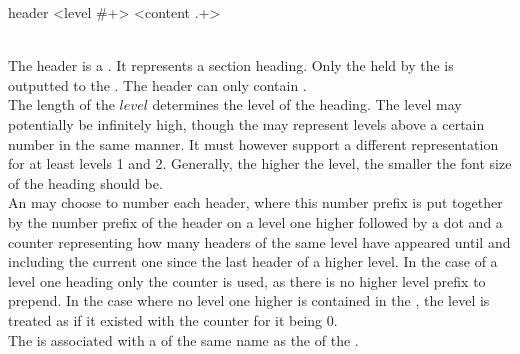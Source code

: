 \begin{identifier}{header}
<level #+> <content .+>
\end{identifier}
 \\

The header is a . It represents a section heading. Only the  held by the  is outputted to the . The header can only contain .\\

The length of the \inline$level$  determines the level of the heading. The level may potentially be infinitely high, though the  may represent levels above a certain number in the same manner. It must however support a different representation for at least levels 1 and 2. Generally, the higher the level, the smaller the font size of the heading should be. \\

An  may choose to number each header, where this number prefix is put together by the number prefix of the header on a level one higher followed by a dot and a counter representing how many headers of the same level have appeared until and including the current one since the last header of a higher level. In the case of a level one heading only the counter is used, as there is no higher level prefix to prepend. In the case where no level one higher is contained in the , the level is treated as if it existed with the counter for it being 0.\\

The  is associated with a  of the same name as the  of the . \\

